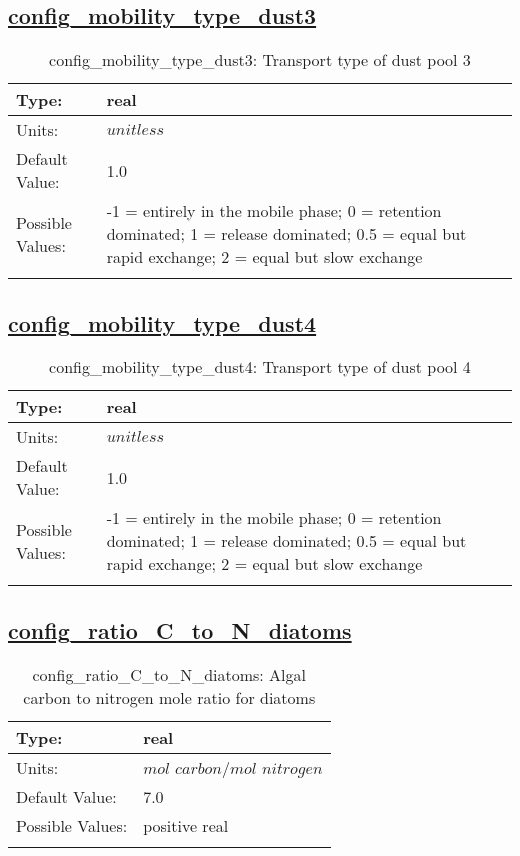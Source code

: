\subsection[config\_mobility\_type\_dust3]{\hyperref[sec:nm_tab_biogeochemistry]{config\_mobility\_type\_dust3}}
\label{subsec:nm_sec_config_mobility_type_dust3}
\begin{center}
\begin{longtable}{| p{2.0in} || p{4.0in} |}
    \hline
    Type: & real \\
    \hline
    Units: & $unitless$ \\
    \hline
    Default Value: & 1.0 \\
    \hline
    Possible Values: & -1 = entirely in the mobile phase; 0 = retention dominated;     1 = release dominated; 0.5 = equal but rapid exchange;     2 = equal but slow exchange \\
    \hline
    \caption{config\_mobility\_type\_dust3: Transport type of dust pool 3}
\end{longtable}
\end{center}
\subsection[config\_mobility\_type\_dust4]{\hyperref[sec:nm_tab_biogeochemistry]{config\_mobility\_type\_dust4}}
\label{subsec:nm_sec_config_mobility_type_dust4}
\begin{center}
\begin{longtable}{| p{2.0in} || p{4.0in} |}
    \hline
    Type: & real \\
    \hline
    Units: & $unitless$ \\
    \hline
    Default Value: & 1.0 \\
    \hline
    Possible Values: & -1 = entirely in the mobile phase; 0 = retention dominated;     1 = release dominated; 0.5 = equal but rapid exchange;     2 = equal but slow exchange \\
    \hline
    \caption{config\_mobility\_type\_dust4: Transport type of dust pool 4}
\end{longtable}
\end{center}
\subsection[config\_ratio\_C\_to\_N\_diatoms]{\hyperref[sec:nm_tab_biogeochemistry]{config\_ratio\_C\_to\_N\_diatoms}}
\label{subsec:nm_sec_config_ratio_C_to_N_diatoms}
\begin{center}
\begin{longtable}{| p{2.0in} || p{4.0in} |}
    \hline
    Type: & real \\
    \hline
    Units: & $mol$ $carbon/mol$ $nitrogen$ \\
    \hline
    Default Value: & 7.0 \\
    \hline
    Possible Values: & positive real \\
    \hline
    \caption{config\_ratio\_C\_to\_N\_diatoms: Algal carbon to nitrogen mole ratio for diatoms}
\end{longtable}
\end{center}
